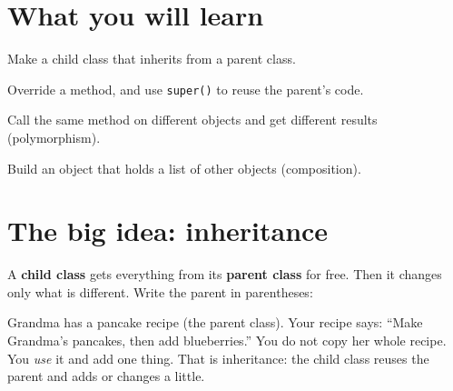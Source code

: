 
\section{What you will learn}
\begin{checklist}
  \item Make a child class that inherits from a parent class.
  \item Override a method, and use \texttt{super()} to reuse the parent's code.
  \item Call the same method on different objects and get different results (polymorphism).
  \item Build an object that holds a list of other objects (composition).
\end{checklist}

\section{The big idea: inheritance}
A \textbf{child class} gets everything from its \textbf{parent class} for free. Then it changes only what is different. Write the parent in parentheses:

\begin{analogy}
Grandma has a pancake recipe (the parent class). Your recipe says: \enquote{Make Grandma's pancakes, then add blueberries.} You do not copy her whole recipe. You \emph{use} it and add one thing. That is inheritance: the child class reuses the parent and adds or changes a little.
\end{analogy}

